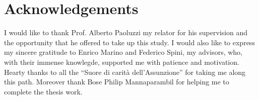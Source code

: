 \chapter{Acknowledgements}
\label{cha:acknowledgements}
I would like to thank Prof. Alberto Paoluzzi my relator for his supervision and the opportunity that he offered to take up this study. I would also like to express my sincere gratitude to Enrico Marino and Federico Spini, my advisors, who, with their immense knowlegde, supported me with patience and  motivation.
\newline
Hearty thanks to all the “Suore di carità dell'Assunzione” for taking me along this path.
\newline
Moreover thank Bose Philip Mannaparambil for helping me to complete the thesis work.
